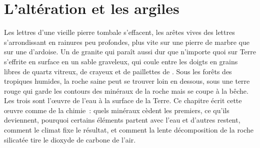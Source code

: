 \chapter{L'altération et les argiles}\label{ch:b1:weathering-clays}

Les lettres d'une vieille pierre tombale s'effacent, les arêtes vives des lettres
s'arrondissant en rainures peu profondes, plus vite sur une pierre de marbre que sur une d'ardoise.
Un  de granite qui paraît aussi dur que n'importe quoi sur Terre s'effrite
en surface en un sable graveleux, qui coule entre les doigts en grains libres
de quartz vitreux, de  crayeux et de paillettes de . Sous les forêts des
tropiques humides, la roche saine peut se trouver loin en dessous, sous une terre rouge
qui garde les contours des minéraux de la roche mais se coupe à la bêche.
Les trois sont l'œuvre de l'eau à la surface de la Terre. Ce chapitre écrit
cette œuvre comme de la chimie~: quels minéraux cèdent les premiers, ce qu'ils deviennent, pourquoi
certains éléments partent avec l'eau et d'autres restent, comment le climat fixe
le résultat, et comment la lente décomposition de la roche silicatée tire le dioxyde de carbone
de l'air.

